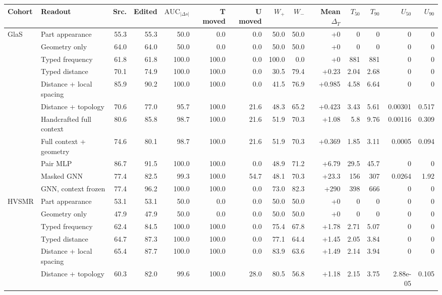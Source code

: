 \begin{tabular}{@{}llrrrrrrrrrrrr@{}}
\toprule
Cohort & Readout & Src. & Edited & $\mathrm{AUC}_{|\Delta s|}$ & T moved & U moved & $W_+$ & $W_-$ & Mean $\Delta_T$ & $T_{50}$ & $T_{90}$ & $U_{50}$ & $U_{90}$ \\
\midrule
GlaS & Part appearance & 55.3 & 55.3 & 50.0 & 0.0 & 0.0 & 50.0 & 50.0 & +0 & 0 & 0 & 0 & 0 \\
 & Geometry only & 64.0 & 64.0 & 50.0 & 0.0 & 0.0 & 50.0 & 50.0 & +0 & 0 & 0 & 0 & 0 \\
 & Typed frequency & 61.8 & 61.8 & 100.0 & 100.0 & 0.0 & 100.0 & 0.0 & +0 & 881 & 881 & 0 & 0 \\
 & Typed distance & 70.1 & 74.9 & 100.0 & 100.0 & 0.0 & 30.5 & 79.4 & +0.23 & 2.04 & 2.68 & 0 & 0 \\
 & Distance + local spacing & 85.9 & 90.2 & 100.0 & 100.0 & 0.0 & 41.5 & 76.9 & +0.985 & 4.58 & 6.64 & 0 & 0 \\
 & Distance + topology & 70.6 & 77.0 & 95.7 & 100.0 & 21.6 & 48.3 & 65.2 & +0.423 & 3.43 & 5.61 & 0.00301 & 0.517 \\
 & Handcrafted full context & 80.6 & 85.8 & 98.7 & 100.0 & 21.6 & 51.9 & 70.3 & +1.08 & 5.8 & 9.76 & 0.00116 & 0.309 \\
 & Full context + geometry & 74.6 & 80.1 & 98.7 & 100.0 & 21.6 & 51.9 & 70.3 & +0.369 & 1.85 & 3.11 & 0.0005 & 0.094 \\
 & Pair MLP & 86.7 & 91.5 & 100.0 & 100.0 & 0.0 & 48.9 & 71.2 & +6.79 & 29.5 & 45.7 & 0 & 0 \\
 & Masked GNN & 77.4 & 82.5 & 99.3 & 100.0 & 54.7 & 48.1 & 70.3 & +23.3 & 156 & 307 & 0.0264 & 1.92 \\
 & GNN, context frozen & 77.4 & 96.2 & 100.0 & 100.0 & 0.0 & 73.0 & 82.3 & +290 & 398 & 666 & 0 & 0 \\
\midrule
HVSMR & Part appearance & 53.1 & 53.1 & 50.0 & 0.0 & 0.0 & 50.0 & 50.0 & +0 & 0 & 0 & 0 & 0 \\
 & Geometry only & 47.9 & 47.9 & 50.0 & 0.0 & 0.0 & 50.0 & 50.0 & +0 & 0 & 0 & 0 & 0 \\
 & Typed frequency & 62.4 & 84.5 & 100.0 & 100.0 & 0.0 & 75.4 & 67.8 & +1.78 & 2.71 & 5.07 & 0 & 0 \\
 & Typed distance & 64.7 & 87.3 & 100.0 & 100.0 & 0.0 & 77.1 & 64.4 & +1.45 & 2.05 & 3.84 & 0 & 0 \\
 & Distance + local spacing & 65.4 & 87.7 & 100.0 & 100.0 & 0.0 & 83.9 & 63.6 & +1.49 & 2.14 & 3.94 & 0 & 0 \\
 & Distance + topology & 60.3 & 82.0 & 99.6 & 100.0 & 28.0 & 80.5 & 56.8 & +1.18 & 2.15 & 3.75 & 2.88e-05 & 0.105 \\

\end{tabular}
